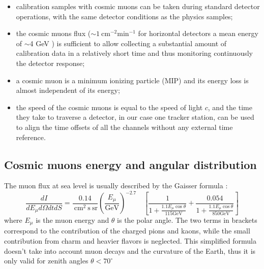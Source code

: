  

\begin{itemize}
    \item calibration samples with cosmic muons 
    can be taken during standard detector operations, 
    with the same detector conditions as the physics samples;
    \item the cosmic muons flux 
    ($\sim 1 \ \text{cm}^{-2} \text{min}^{-1}$ 
    for horizontal detectors  a mean
     energy of $\sim$4 GeV \cite{muonflux}) 
    is sufficient to allow
    collecting a substantial amount of calibration 
    data in a relatively short time and 
    thus monitoring continuously the detector response;
    \item a cosmic muon is a minimum ionizing 
    particle (MIP) and 
    its energy loss is almost 
    independent of its energy;
    \item the speed of the cosmic muons is equal to the 
    speed of light $c$, and the time they take to traverse 
    a detector, in our case one tracker station, can be 
    used to align the time offsets of all the channels  
    without any external time reference.
\end{itemize}
\subsection{Cosmic muons energy and angular distribution}\label{distcos}
The muon flux at sea level is usually described by the  Gaisser formula \cite{guan2015parametrization}:
\begin{equation}
    \frac{d I}{d E_\mu d \Omega d t d S}=\frac{0.14}{\mathrm{~cm}^2 \mathrm{~s} \ \mathrm{sr}}\left(\frac{E_\mu}{\mathrm{GeV}}\right)^{-2.7} \quad\left[\frac{1}{1+\frac{1.1 E_\mu \cos \theta}{115 \mathrm{GeV}}}+\frac{0.054}{1+\frac{1.1 E_\mu \cos \theta}{850 \mathrm{GeV}}}\right]
    \end{equation}
where $E_\mu$ is the muon energy and $\theta$ is the  polar angle. 
The two terms in brackets correspond to the contribution of the charged pions and kaons, while 
the small contribution from charm and heavier flavors is neglected. 
This simplified formula doesn't take into account muon decays and the curvature of the Earth, 
thus it is only valid for zenith angles $\theta < 70^\circ$


